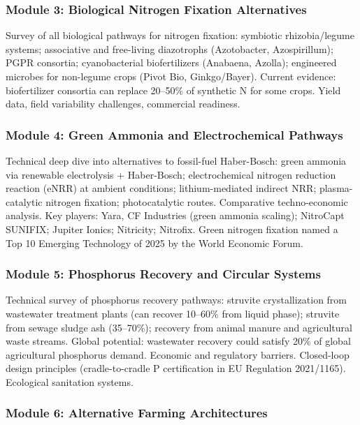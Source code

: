 \documentclass[11pt,letterpaper]{article}
\begin{document}
\subsubsection{Module 3: Biological Nitrogen Fixation Alternatives}

Survey of all biological pathways for nitrogen fixation: symbiotic rhizobia/legume systems; associative and free-living diazotrophs (Azotobacter, Azospirillum); PGPR consortia; cyanobacterial biofertilizers (Anabaena, Azolla); engineered microbes for non-legume crops (Pivot Bio, Ginkgo/Bayer). Current evidence: biofertilizer consortia can replace 20--50\% of synthetic N for some crops. Yield data, field variability challenges, commercial readiness.

\subsubsection{Module 4: Green Ammonia and Electrochemical Pathways}

Technical deep dive into alternatives to fossil-fuel Haber-Bosch: green ammonia via renewable electrolysis + Haber-Bosch; electrochemical nitrogen reduction reaction (eNRR) at ambient conditions; lithium-mediated indirect NRR; plasma-catalytic nitrogen fixation; photocatalytic routes. Comparative techno-economic analysis. Key players: Yara, CF Industries (green ammonia scaling); NitroCapt SUNIFIX; Jupiter Ionics; Nitricity; Nitrofix. Green nitrogen fixation named a Top 10 Emerging Technology of 2025 by the World Economic Forum.

\subsubsection{Module 5: Phosphorus Recovery and Circular Systems}

Technical survey of phosphorus recovery pathways: struvite crystallization from wastewater treatment plants (can recover 10--60\% from liquid phase); struvite from sewage sludge ash (35--70\%); recovery from animal manure and agricultural waste streams. Global potential: wastewater recovery could satisfy 20\% of global agricultural phosphorus demand. Economic and regulatory barriers. Closed-loop design principles (cradle-to-cradle P certification in EU Regulation 2021/1165). Ecological sanitation systems.

\subsubsection{Module 6: Alternative Farming Architectures}
\end{document}
